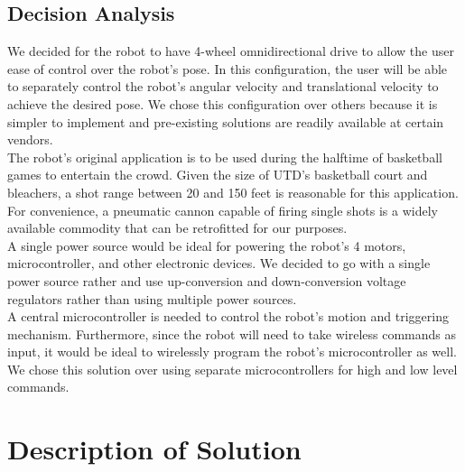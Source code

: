 \documentclass[letterpaper,12pt]{article}
\begin{document}
\subsection{Decision Analysis}
\noindent We decided for the robot to have 4-wheel omnidirectional drive to allow the user ease of control over the robot's pose. In this configuration, the user will be able to separately control the robot's angular velocity and translational velocity to achieve the desired pose. We chose this configuration over others because it is simpler to implement and pre-existing solutions are readily available at certain vendors. \\

\noindent The robot's original application is to be used during the halftime of basketball games to entertain the crowd. Given the size of UTD's basketball court and bleachers, a shot range between 20 and 150 feet is reasonable for this application. For convenience, a pneumatic cannon capable of firing single shots is a widely available commodity that can be retrofitted for our purposes. \\

\noindent A single power source would be ideal for powering the robot's 4 motors, microcontroller, and other electronic devices. We decided to go with a single power source rather and use up-conversion and down-conversion voltage regulators rather than using multiple power sources. \\ 

\noindent A central microcontroller is needed to control the robot's motion and triggering mechanism. Furthermore, since the robot will need to take wireless commands as input, it would be ideal to wirelessly program the robot's microcontroller as well. We chose this solution over using separate microcontrollers for high and low level commands. \\

\section{Description of Solution}
\end{document}

